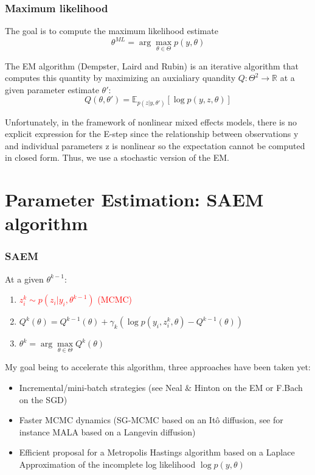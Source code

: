 \documentclass[xcolor={dvipsnames}]{beamer}
\begin{document}
\begin{frame}
\frametitle{Maximum likelihood}

The goal is to compute the maximum likelihood estimate
\begin{equation}
\theta^{ML} = \arg \max \limits_{\theta \in \Theta} p(y,\theta)
\end{equation}

The EM algorithm (Dempster, Laird and Rubin) is an iterative algorithm that computes this quantity by maximizing an auxialiary quandity $Q: \Theta^2 \to \mathbb{R}$ at a given parameter estimate $\theta'$:
\begin{equation}
Q(\theta, \theta') = \mathbb{E}_{p(z|y,\theta')}\left[ \log p(y, z, \theta) \right]
\end{equation}

Unfortunately, in the framework of nonlinear mixed effects models, there is no explicit expression for the E-step since the relationship between observations y and individual parameters z is nonlinear so the expectation cannot be computed in closed form. Thus, we use a stochastic version of the EM.
\end{frame}



\section{Parameter Estimation: SAEM algorithm}

\begin{frame}
\frametitle{SAEM}
At a given $\theta^{k-1}$:
\begin{enumerate}
  \item \textcolor{red}{$z_i^k \sim p(z_i|y_i,\theta^{k-1})$ \quad (MCMC)}
  \item $Q^k(\theta) = Q^{k-1}(\theta)+ \gamma_k(\log p(y_i, z_i^k, \theta) - Q^{k-1}(\theta))$
  \item $\theta ^k = \arg \max \limits_{\theta \in \Theta} Q^k(\theta)$
\end{enumerate}


My goal being to accelerate this algorithm, three approaches have been taken yet:
\begin{itemize}
  \item Incremental/mini-batch strategies (see Neal $\&$ Hinton on the EM or F.Bach on the SGD)
  \item Faster MCMC dynamics (SG-MCMC based on an Itô diffusion, see for instance MALA based on a Langevin diffusion)
  \item Efficient proposal for a Metropolis Hastings algorithm based on a Laplace Approximation of the incomplete log likelihood $\log p(y,\theta)$
\end{itemize}


\end{frame}
\end{document}
